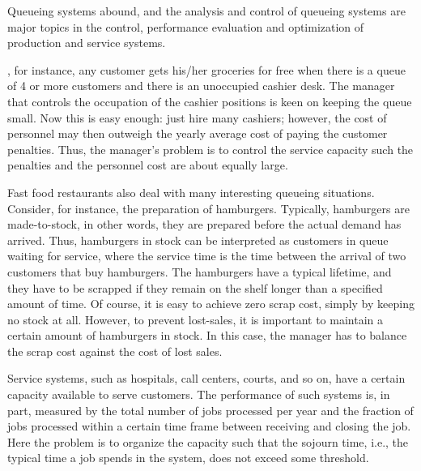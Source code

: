 \documentclass[queueing_book]{subfiles}
\begin{document}
Queueing systems abound, and the analysis and control of queueing systems are major topics in the control, performance evaluation and optimization of production and service systems.


, for instance, any customer gets his/her groceries for free when there is a queue of 4 or more customers and there is an unoccupied cashier desk.
The manager that controls the occupation of the cashier positions is keen on keeping the queue small.
Now this is easy enough: just hire many cashiers; however, the cost of personnel may then outweigh the yearly average cost of paying the customer penalties.
Thus, the manager's problem is to control the service capacity such the penalties and the personnel cost are about equally large.

Fast food restaurants also deal with many interesting queueing situations.
Consider, for instance, the preparation of hamburgers.
Typically, hamburgers are made-to-stock, in other words, they are prepared before the actual demand has arrived.
Thus, hamburgers in stock can be interpreted as customers in queue waiting for service, where the service time is the time between the arrival of two customers that buy hamburgers.
The hamburgers have a typical lifetime, and they have to be scrapped if they remain on the shelf longer than a specified amount of time.
Of course, it is easy to achieve zero scrap cost, simply by keeping no stock at all.
However, to prevent lost-sales, it is important to maintain a certain amount of hamburgers in stock.
In this case, the manager has to balance the scrap cost against the cost of lost sales.

Service systems, such as hospitals, call centers, courts, and so on, have a certain capacity available to serve customers.
The performance of such systems is, in part, measured by the total number of jobs processed per year and the fraction of jobs processed within a certain time frame between receiving and closing the job.
Here the problem is to organize the capacity such that the sojourn time, i.e., the typical time a job spends in the system, does not exceed some threshold.
\end{document}
